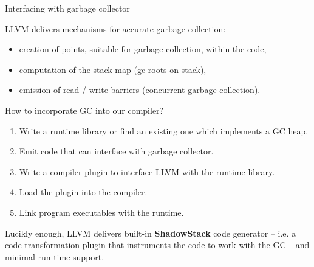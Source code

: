 \documentclass[8pt]{beamer}
\begin{document}
\begin{frame}[fragile]{Interfacing with garbage collector}
  \begin{block}{LLVM delivers mechanisms for accurate garbage collection:}
    \begin{itemize}
      \item creation of points, suitable for garbage collection, within the
        code, 
      \item computation of the stack map (gc roots on stack),
      \item emission of read / write barriers (concurrent garbage collection).
    \end{itemize}
  \end{block}

  \begin{block}{How to incorporate GC into our compiler?}
    \begin{enumerate}
      \item Write a runtime library or find an existing one which implements a
        GC heap.
      \item Emit code that can interface with garbage collector.
      \item Write a compiler plugin to interface LLVM with the runtime library.
      \item Load the plugin into the compiler.
      \item Link program executables with the runtime.
    \end{enumerate}
  \end{block}

  \begin{exampleblock}{}
    Lucikly enough, LLVM delivers built-in \textbf{ShadowStack} code generator
    -- i.e. a code transformation plugin that instruments the code to work with
    the GC -- and minimal run-time support.
  \end{exampleblock} 
\end{frame}
\end{document}
